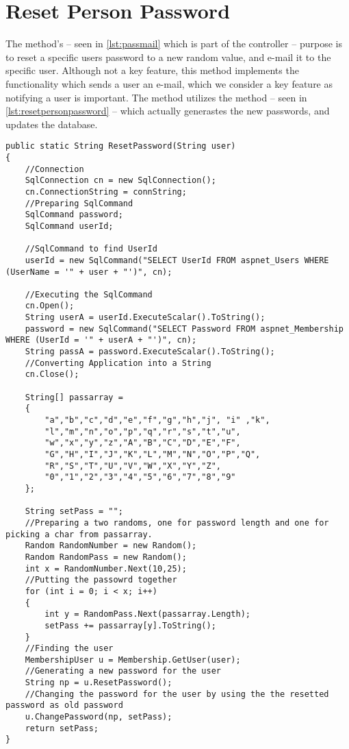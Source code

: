 \section{Reset Person Password}
\label{sec:resetpersonpassword}

The  method's -- seen in \ref{lst:passmail} which is part of the  controller -- purpose is to reset a specific users password to a new random value, and e-mail it to the specific user. Although not a key feature, this method implements the functionality which sends a user an e-mail, which we consider a key feature as notifying a user is important. The  method utilizes the  method -- seen in \ref{lst:resetpersonpassword} -- which actually generastes the new passwords, and updates the database.

\begin{lstlisting}[style=sourceCode, caption=\myCaption{The ResetPassword(String user) method}, label=lst:resetpersonpassword]
public static String ResetPassword(String user)
{   
    //Connection
    SqlConnection cn = new SqlConnection();
    cn.ConnectionString = connString;
    //Preparing SqlCommand
    SqlCommand password;
    SqlCommand userId;

    //SqlCommand to find UserId
    userId = new SqlCommand("SELECT UserId FROM aspnet_Users WHERE (UserName = '" + user + "')", cn);
    
    //Executing the SqlCommand
    cn.Open();
    String userA = userId.ExecuteScalar().ToString();
    password = new SqlCommand("SELECT Password FROM aspnet_Membership WHERE (UserId = '" + userA + "')", cn);
    String passA = password.ExecuteScalar().ToString();
    //Converting Application into a String
    cn.Close();

    String[] passarray =
    {
        "a","b","c","d","e","f","g","h","j", "i" ,"k",
        "l","m","n","o","p","q","r","s","t","u",
        "w","x","y","z","A","B","C","D","E","F",
        "G","H","I","J","K","L","M","N","O","P","Q",
        "R","S","T","U","V","W","X","Y","Z",
        "0","1","2","3","4","5","6","7","8","9"
    };

    String setPass = "";
    //Preparing a two randoms, one for password length and one for picking a char from passarray.
    Random RandomNumber = new Random();
    Random RandomPass = new Random();
    int x = RandomNumber.Next(10,25);
    //Putting the passowrd together
    for (int i = 0; i < x; i++)
    {
        int y = RandomPass.Next(passarray.Length);
        setPass += passarray[y].ToString();
    }
    //Finding the user
    MembershipUser u = Membership.GetUser(user);
    //Generating a new password for the user
    String np = u.ResetPassword();
    //Changing the password for the user by using the the resetted password as old password
    u.ChangePassword(np, setPass);
    return setPass;
}
\end{lstlisting}


